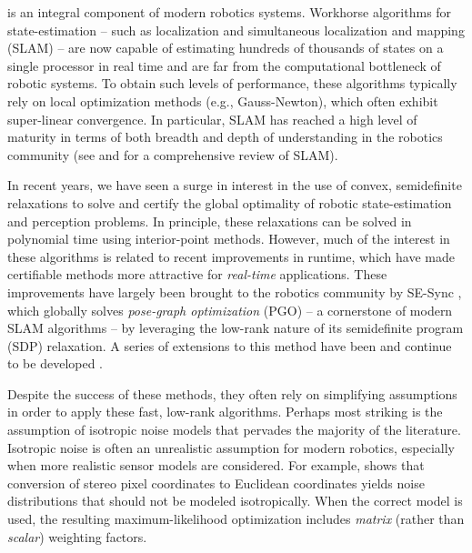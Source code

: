 \documentclass[lettersize,journal]{IEEEtran}
\begin{document}
 is an integral component of modern robotics systems. Workhorse algorithms for state-estimation -- such as localization and simultaneous localization and mapping (SLAM) -- are now capable of estimating hundreds of thousands of states on a single processor in real time \cite{rosenAdvancesInferenceRepresentation2021} and are far from the computational bottleneck of robotic systems. To obtain such levels of performance, these algorithms typically rely on local optimization methods (e.g., Gauss-Newton), which often exhibit super-linear convergence. In particular, SLAM has reached a high level of maturity in terms of both breadth and depth of understanding in the robotics community (see \cite{baileySimultaneousLocalizationMapping2006} and \cite{durrant-whyteSimultaneousLocalizationMapping2006} for a comprehensive review of SLAM).  

In recent years, we have seen a surge in interest in the use of convex, semidefinite relaxations to solve and certify the global optimality of robotic state-estimation and perception problems. 
In principle, these relaxations can be solved in polynomial time using interior-point methods\cite{vandenbergheSemidefiniteProgramming1996}. However, much of the interest in these algorithms is related to recent improvements in runtime, which have made certifiable methods more attractive for \emph{real-time} applications. These improvements have largely been brought to the robotics community by SE-Sync \cite{rosenSESyncCertifiablyCorrect2019}, which globally solves \emph{pose-graph optimization} (PGO) -- a cornerstone of modern SLAM algorithms -- by leveraging the low-rank nature of its semidefinite program (SDP) relaxation. A series of extensions to this method have been and continue to be developed \cite{rosenAdvancesInferenceRepresentation2021}.

Despite the success of these methods, they often rely on simplifying assumptions in order to apply these fast, low-rank algorithms. Perhaps most striking is the assumption of isotropic noise models that pervades the majority of the literature. Isotropic noise is often an unrealistic assumption for modern robotics, especially when more realistic sensor models are considered. For example, \cite{matthiesErrorModelingStereo1987} shows that conversion of stereo pixel coordinates to Euclidean coordinates yields noise distributions that should not be modeled isotropically. When the correct model is used, the resulting maximum-likelihood optimization includes \emph{matrix} (rather than \emph{scalar}) weighting factors. 
\end{document}
